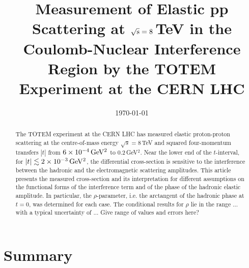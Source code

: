 \documentclass[pdftex,twocolumn,epjc3]{svjour3}
\def\todo#1{{\color{red} #1}}
\begin{document}
\title{Measurement of Elastic pp Scattering at $\sqrt{\hbox{s}} = \hbox{8}$\,TeV in the 
Coulomb-Nuclear Interference Region by the TOTEM Experiment at the CERN LHC}




\date{\today}

\maketitle

\begin{abstract}
The TOTEM experiment at the CERN LHC has measured elastic proton-proton 
scattering at the centre-of-mass energy 
$\sqrt{s}=8\,$TeV and squared four-momentum transfers $|t|$ from $6\times10^{-4}\,\rm GeV^{2}$ to 0.2\,GeV$^{2}$.
Near the lower end of the $t$-interval, for
$|t| \lesssim 2\times10^{-3}\,\rm GeV^{2}$, the differential cross-section is 
sensitive to the 
interference between the hadronic and the electromagnetic scattering amplitudes.
This article presents the measured cross-section and its interpretation for 
different assumptions on the functional forms of the interference term and of 
the phase of the hadronic elastic amplitude. In 
particular, the $\rho$-parameter, i.e. 
the arctangent of the hadronic phase at $t = 0$,
was determined for each case. The conditional results for $\rho$ lie in the 
range ... with a typical uncertainty of ...
\todo{Give range of values and errors here?}

\end{abstract}













\section{Summary}
\end{document}
